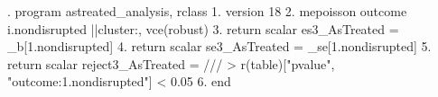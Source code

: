 . program astreated_analysis, rclass
  1.   version 18
  2.   mepoisson outcome i.nondisrupted ||cluster:, vce(robust)
  3.   return scalar es3_AsTreated      = _b[1.nondisrupted]
  4.   return scalar se3_AsTreated      = _se[1.nondisrupted]
  5.   return scalar reject3_AsTreated  =                                 ///
>                       r(table)["pvalue", "outcome:1.nondisrupted"] < 0.05
  6. end
{\smallskip}

